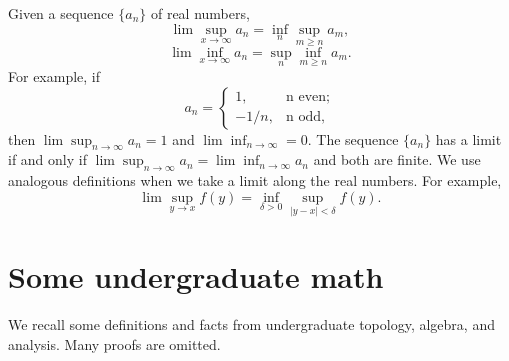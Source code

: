 \begin{sloppypar}
\newline Given a sequence $\lbrace a_n \rbrace$ of real numbers,
$$\lim\sup_{x\to\infty} a_n = \inf_n \sup_{m \geq n} a_m,$$
$$\lim\inf_{x\to\infty} a_n = \sup_n \inf_{m \geq n} a_m.$$
For example, if
\begin{equation}
a_n=
    \begin{cases}
      1, & \text{n even;}\\
      -1/n, & \text{n odd,}
    \end{cases}
\end{equation}
then $\lim \sup_{n\to\infty}a_n = 1$ and $\lim\inf_{n\to\infty} = 0$. The sequence $\lbrace a_n \rbrace$ has a limit if and only if $\lim \sup_{n\to\infty}a_n = \lim\inf_{n\to\infty}a_n$ and both are finite. We use analogous definitions when we take a limit along the real numbers. For example,
$$\lim\sup_{y\to x}f(y) = \inf_{\delta >0} \sup_{|y-x|< \delta}f(y).$$

\section{Some undergraduate math}

We recall some definitions and facts from undergraduate topology, algebra, and analysis. Many proofs are omitted.
\bigskip


\end{sloppypar}
